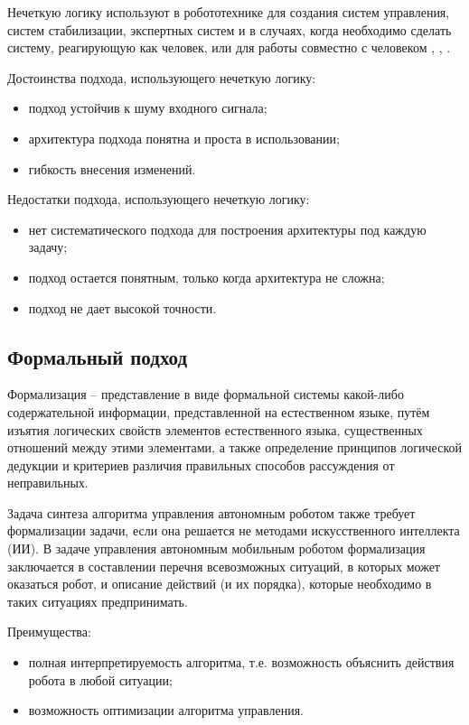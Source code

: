 Нечеткую логику используют в робототехнике для создания систем управления, систем стабилизации, экспертных систем и в случаях, когда необходимо сделать систему, реагирующую как человек, или для работы совместно с человеком \cite{fuzzy1}, \cite{fuzzy2}, \cite{fuzzy3}.

Достоинства подхода, использующего нечеткую логику:
\begin{itemize}
	\item подход устойчив к шуму входного сигнала;
	\item архитектура подхода понятна и проста в использовании;
	\item гибкость внесения изменений.
\end{itemize}

Недостатки подхода, использующего нечеткую логику:
\begin{itemize}
	\item нет систематического подхода для построения архитектуры под каждую задачу;
	\item подход остается понятным, только когда архитектура не сложна;
	\item подход не дает высокой точности.
\end{itemize}


\subsection{Формальный подход}
Формализация – представление в виде формальной системы какой-либо содержательной информации, представленной на естественном языке, путём изъятия логических свойств элементов естественного языка, существенных отношений между этими элементами, а также определение принципов  логической дедукции и критериев различия правильных способов рассуждения от неправильных.

Задача синтеза алгоритма управления автономным роботом также требует формализации задачи, если она решается не методами искусственного интеллекта (ИИ). 
В задаче управления автономным мобильным роботом формализация заключается в составлении перечня всевозможных ситуаций, в которых может оказаться робот, и описание действий (и их порядка), которые необходимо в таких ситуациях предпринимать. 

Преимущества:
\begin{itemize}
	\item полная интерпретируемость алгоритма, т.е. возможность объяснить действия робота в любой ситуации;
	\item возможность оптимизации алгоритма управления.
\end{itemize}

